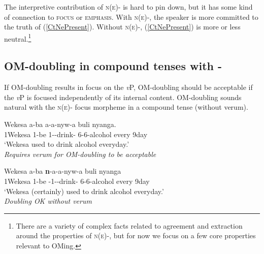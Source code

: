 \documentclass[output=paper]{langscibook}
\begin{document}
The interpretive contribution of \textsc{n(e)-} is hard to pin down, but it has some kind of connection to \textsc{focus} or \textsc{emphasis}. With \textsc{n(e)-}, the speaker is more committed to the truth of (\ref{CtNePresent}). Without \textsc{n(e)-}, (\ref{CtNePresent}) is more or less neutral.\footnote{There are a variety of complex facts related to agreement and extraction around the properties of \textsc{n(e)-}, but for now we focus on a few core properties relevant to OMing.}  

\subsection{OM-doubling in compound tenses with \Ne{}-}

If OM-doubling results in focus on the \textit{v}P, OM-doubling should be acceptable if the \textit{v}P is focused independently of its internal content. OM-doubling sounds natural with the \textsc{n(e)-} focus morpheme in a compound tense (without verum). 

\begin{exe}
\ex 
\begin{xlist}

\ex 
\gll Wekesa a-ba a-a-nyw-a  buli nyanga.\\
1Wekesa 1\Sm-be 1\Sm-\Om-drink-\Fv{} 6-6-alcohol every 9day \\
\glt `Wekesa used to drink alcohol everyday.' \\ \textit{Requires verum for OM-doubling to be acceptable}

\ex \label{BasicExDoublingWithNe}
\gll Wekesa a-ba \textbf{n}-a-a-nyw-a  buli nyanga \\
1Wekesa 1-be \textbf{\Ne}-1\Sm-\Om-drink-\Fv{} 6-6-alcohol every 9day \\
\glt `Wekesa (certainly) used to drink alcohol everyday.' \\ \textit{Doubling OK without verum}

\end{xlist}
\end{exe}



\end{document}
